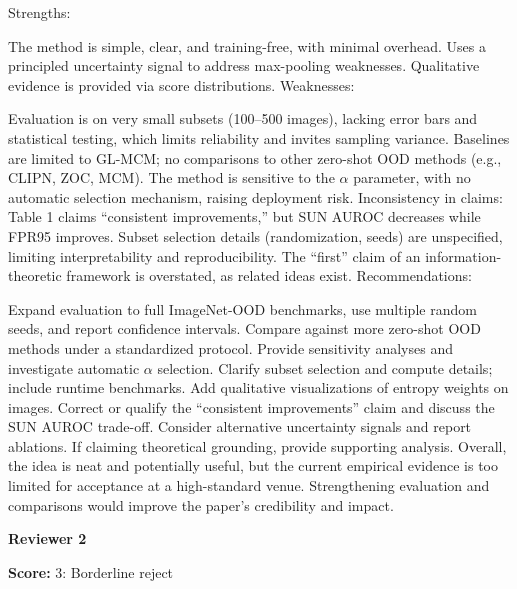 \begin{tcolorbox}[
    colback=white,
    colframe=black!70,
    title=Reviewer Comments,
    breakable=true,
    fonttitle=\bfseries
]
Strengths:

The method is simple, clear, and training-free, with minimal overhead.
Uses a principled uncertainty signal to address max-pooling weaknesses.
Qualitative evidence is provided via score distributions.
Weaknesses:

Evaluation is on very small subsets (100–500 images), lacking error bars and statistical testing, which limits reliability and invites sampling variance.
Baselines are limited to GL-MCM; no comparisons to other zero-shot OOD methods (e.g., CLIPN, ZOC, MCM).
The method is sensitive to the $\alpha$ parameter, with no automatic selection mechanism, raising deployment risk.
Inconsistency in claims: Table 1 claims “consistent improvements,” but SUN AUROC decreases while FPR95 improves.
Subset selection details (randomization, seeds) are unspecified, limiting interpretability and reproducibility.
The “first” claim of an information-theoretic framework is overstated, as related ideas exist.
Recommendations:

Expand evaluation to full ImageNet-OOD benchmarks, use multiple random seeds, and report confidence intervals.
Compare against more zero-shot OOD methods under a standardized protocol.
Provide sensitivity analyses and investigate automatic $\alpha$ selection.
Clarify subset selection and compute details; include runtime benchmarks.
Add qualitative visualizations of entropy weights on images.
Correct or qualify the “consistent improvements” claim and discuss the SUN AUROC trade-off.
Consider alternative uncertainty signals and report ablations.
If claiming theoretical grounding, provide supporting analysis.
Overall, the idea is neat and potentially useful, but the current empirical evidence is too limited for acceptance at a high-standard venue. Strengthening evaluation and comparisons would improve the paper’s credibility and impact.



\end{tcolorbox}



\textbf{Reviewer 2}
\begin{tcolorbox}[
    colback=gray!5,
    colframe=gray!60,
    title=Review Score,
    fonttitle=\bfseries
]
\textbf{Score:} 3: Borderline reject
\end{tcolorbox}

